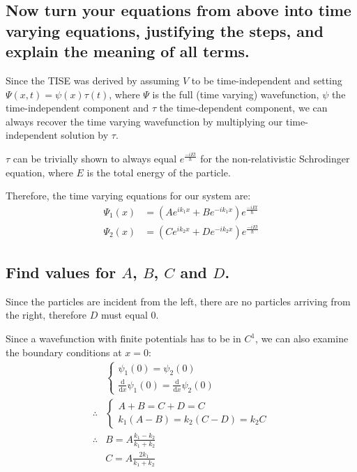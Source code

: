 \documentclass[a4paper]{scrartcl}
\begin{document}
\subsection{Now turn your equations from above into time varying equations, justifying the steps, and explain the meaning of all terms.}
Since the TISE was derived by assuming \(V\) to be time-independent and setting \(\Psi(x, t) = \psi(x) \tau(t)\), where \(\Psi\) is the full (time varying) wavefunction, \(\psi\) the time-independent component and \(\tau\) the time-dependent component, we can always recover the time varying wavefunction by multiplying our time-independent solution by \(\tau\).

\(\tau\) can be trivially shown to always equal \(e^{\frac{-i E t}{\hbar}}\) for the non-relativistic Schrodinger equation, where \(E\) is the total energy of the particle.

Therefore, the time varying equations for our system are:
\begin{align*}
    \Psi_1(x) &= \left(A e^{i k_1 x} + B e^{-i k_1 x}\right) e^{\frac{-i E t}{\hbar}} \\
    \Psi_2(x) &= \left(C e^{i k_2 x} + D e^{-i k_2 x}\right) e^{\frac{-i E t}{\hbar}}
\end{align*}

\subsection{Find values for \(A\), \(B\), \(C\) and \(D\).}
Since the particles are incident from the left, there are no particles arriving from the right, therefore \(D\) must equal 0.

Since a wavefunction with finite potentials has to be in \(C^1\), we can also examine the boundary conditions at \(x = 0\):
\begin{align*}
    &\begin{cases}
        \psi_1(0) = \psi_2(0) \\
        \frac{\mathrm{d}}{\mathrm{d}x} \psi_1(0) = \frac{\mathrm{d}}{\mathrm{d}x} \psi_2(0)
    \end{cases} \\
    \therefore &\begin{cases}
        A + B = C + D = C \\
        k_1 (A - B) = k_2 (C - D) = k_2 C
    \end{cases} \\
    \therefore &B = A \frac{k_1 - k_2}{k_1 + k_2} \\
    &C = A \frac{2 k_1}{k_1 + k_2}
\end{align*}
\end{document}
